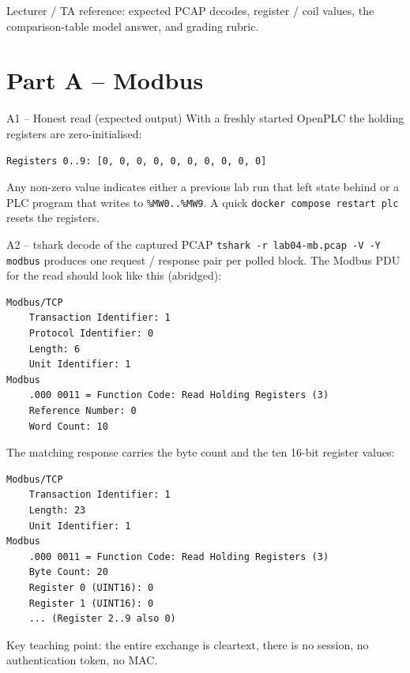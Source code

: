 \documentclass[11pt,a4paper]{article}
\begin{document}
\labheader

\begin{goalbox}
Lecturer / TA reference: expected PCAP decodes, register / coil values,
the comparison-table model answer, and grading rubric.
\end{goalbox}

\section*{Part A -- Modbus}

\begin{solutionbox}{A1 -- Honest read (expected output)}
With a freshly started OpenPLC the holding registers are zero-initialised:
\begin{lstlisting}
Registers 0..9: [0, 0, 0, 0, 0, 0, 0, 0, 0, 0]
\end{lstlisting}
Any non-zero value indicates either a previous lab run that left state
behind or a PLC program that writes to \texttt{\%MW0..\%MW9}. A quick
\texttt{docker compose restart plc} resets the registers.
\end{solutionbox}

\begin{solutionbox}{A2 -- tshark decode of the captured PCAP}
\texttt{tshark -r lab04-mb.pcap -V -Y modbus} produces one request /
response pair per polled block. The Modbus PDU for the read should look
like this (abridged):
\begin{lstlisting}
Modbus/TCP
    Transaction Identifier: 1
    Protocol Identifier: 0
    Length: 6
    Unit Identifier: 1
Modbus
    .000 0011 = Function Code: Read Holding Registers (3)
    Reference Number: 0
    Word Count: 10
\end{lstlisting}
The matching response carries the byte count and the ten 16-bit register
values:
\begin{lstlisting}
Modbus/TCP
    Transaction Identifier: 1
    Length: 23
    Unit Identifier: 1
Modbus
    .000 0011 = Function Code: Read Holding Registers (3)
    Byte Count: 20
    Register 0 (UINT16): 0
    Register 1 (UINT16): 0
    ... (Register 2..9 also 0)
\end{lstlisting}
Key teaching point: the entire exchange is cleartext, there is no
session, no authentication token, no MAC.
\end{solutionbox}
\end{document}
